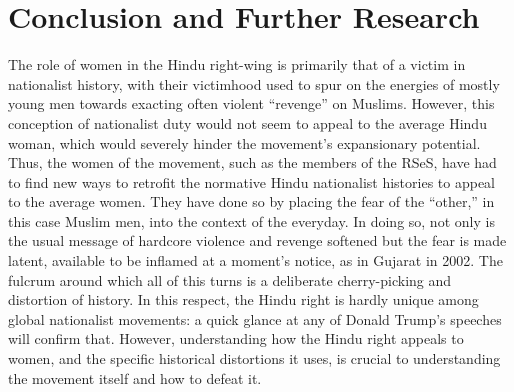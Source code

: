 \documentclass[a4paper, 12pt]{article}
\begin{document}
\section*{Conclusion and Further Research}
The role of women in the Hindu right-wing is primarily that of a victim in nationalist history, with their victimhood used to spur on the energies of mostly young men towards exacting often violent “revenge” on Muslims. However, this conception of nationalist duty would not seem to appeal to the average Hindu woman, which would severely hinder the movement’s expansionary potential. Thus, the women of the movement, such as the members of the RSeS, have had to find new ways to retrofit the normative Hindu nationalist histories to appeal to the average women. They have done so by placing the fear of the “other,” in this case Muslim men, into the context of the everyday. In doing so, not only is the usual message of hardcore violence and revenge softened but the fear is made latent, available to be inflamed at a moment’s notice, as in Gujarat in 2002. The fulcrum around which all of this turns is a deliberate cherry-picking and distortion of history. In this respect, the Hindu right is hardly unique among global nationalist movements: a quick glance at any of Donald Trump’s speeches will confirm that. However, understanding how the Hindu right appeals to women, and the specific historical distortions it uses, is crucial to understanding the movement itself and how to defeat it.
\par
\end{document}
